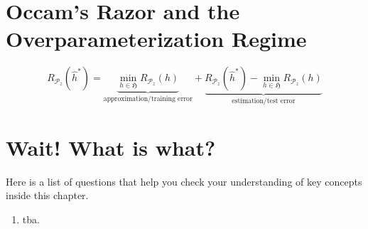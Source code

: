 \section{Occam's Razor and the Overparameterization Regime}
$$
	R_{\mathcal{P}_z}(\hat{h}^*) = \underbrace{\min_{h \in \mathfrak{H}} R_{\mathcal{P}_z}(h)}_{\text{approximation/training error}} + \underbrace{R_{\mathcal{P}_z}(\hat{h}^*) - \min_{h \in \mathfrak{H}} R_{\mathcal{P}_z}(h)}_{\text{estimation/test error}} 
	$$

\section*{Wait! What is what?}
Here is a list of questions that help you check your understanding of key
concepts inside this chapter.

\begin{enumerate}
    \item tba. 
\end{enumerate}

